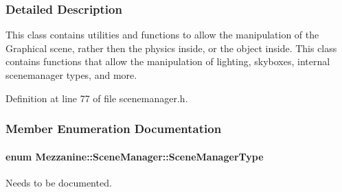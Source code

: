 \subsubsection{Detailed Description}
This class contains utilities and functions to allow the manipulation of the Graphical scene, rather then the physics inside, or the object inside. This class contains functions that allow the manipulation of lighting, skyboxes, internal scenemanager types, and more. 

Definition at line 77 of file scenemanager.h.



\subsubsection{Member Enumeration Documentation}
\hypertarget{classMezzanine_1_1SceneManager_ad6e20c08b97a230314abda3e5826f274}{
\paragraph[{SceneManagerType}]{\setlength{\rightskip}{0pt plus 5cm}enum {\bf Mezzanine::SceneManager::SceneManagerType}}\hfill}
\label{classMezzanine_1_1SceneManager_ad6e20c08b97a230314abda3e5826f274}


Needs to be documented. 

